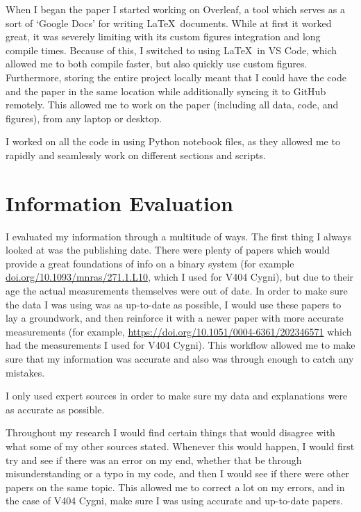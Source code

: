 \documentclass[12pt, a4paper]{article}
\begin{document}
   When I began the paper I started working on Overleaf, a tool which serves as a sort of `Google Docs' for writing \LaTeX~documents. While at first it worked great, it was severely limiting with its custom figures integration and long compile times. Because of this, I switched to using \LaTeX~in VS Code, which allowed me to both compile faster, but also quickly use custom figures. Furthermore, storing the entire project locally meant that I could have the code and the paper in the same location while additionally syncing it to GitHub remotely. This allowed me to work on the paper (including all data, code, and figures), from any laptop or desktop.  

   I worked on all the code in using Python notebook files, as they allowed me to rapidly and seamlessly work on different sections and scripts.
\section{Information Evaluation}
    I evaluated my information through a multitude of ways. The first thing I always looked at was the publishing date. There were plenty of papers which would provide a great foundations of info on a binary system (for example \url{doi.org/10.1093/mnras/271.1.L10}, which I used for V404 Cygni), but due to their age the actual measurements themselves were out of date. In order to make sure the data I was using was as up-to-date as possible, I would use these papers to lay a groundwork, and then reinforce it with a newer paper with more accurate measurements (for example, \url{https://doi.org/10.1051/0004-6361/202346571} which had the measurements I used for V404 Cygni). This workflow allowed me to make sure that my information was accurate and also was through enough to catch any mistakes.

    I only used expert sources in order to make sure my data and explanations were as accurate as possible.

    Throughout my research I would find certain things that would disagree with what some of my other sources stated. Whenever this would happen, I would first try and see if there was an error on my end, whether that be through misunderstanding or a typo in my code, and then I would see if there were other papers on the same topic. This allowed me to correct a lot on my errors, and in the case of V404 Cygni, make sure I was using accurate and up-to-date papers. 
\end{document}
